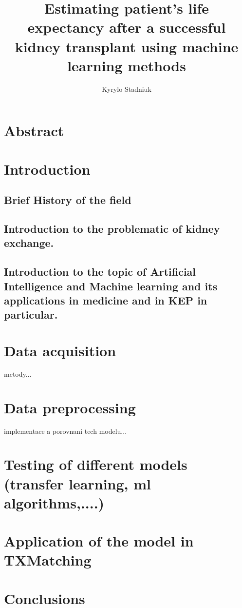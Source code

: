 \documentclass{article}
\title{Estimating patient's life expectancy after a successful kidney transplant using machine learning methods}
\author{Kyrylo Stadniuk}
\begin{document}
	
	\maketitle
	\section{Abstract}
	\section{Introduction}
	\subsection{Brief History of the field}
	\subsection{Introduction to the problematic of kidney exchange.}
	\subsection{Introduction to the topic of Artificial Intelligence and Machine learning and its applications in medicine and in KEP in particular.}
	\section{Data acquisition} metody...
	\section{Data preprocessing} implementace a porovnani tech modelu...
	\section{Testing of different models (transfer learning, ml algorithms,....)}
	\section{Application of the model in TXMatching}
	\section{Conclusions}	
	
	
\end{document}
